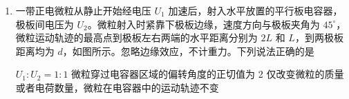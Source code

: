 \documentclass[\gkver]{gaokaozhenti}
\begin{document}
\begin{enumerate}
{$mg = f$，$f = \mu F_{N}$，$F_{N} = k\left(l - \frac{l}{2}\right)$

联立解得 $k = \frac{4mg}{l}$

A 正确；

C．在 PM 之间任取一点 A，令 AO 与 MN 之间的夹角为 $\theta$，则此时弹簧的弹力为

$F = k\left(l - \frac{l}{2\sin\theta}\right)$

小球受到的摩擦力为 $f_{1} = \mu F_{N1} = \mu F \sin \theta$

化简得 $f_{1} = \mu \left( kl \sin \theta - \frac{kl}{2} \right)$

$\theta$ 在 MP 之间增大在 PN 之间变小，即摩擦力先变大后变小，C 错误；

D．根据对称性可知在任意关于 P 点对称的点摩擦力大小相等，因此由对称性可知 M 到 P 和 P 到 N 摩擦力做功大小相等；D 正确；

B．小球运动到 P 点下方 $\frac{1}{2}l$ 时 $\theta = 45^\circ$，此时摩擦力大小为

$f_{1} = \mu \left( kl \frac{\sqrt{2}}{2} - \frac{kl}{2} \right)$

由牛顿第二定律 $mg+F\cos45^\circ-f_1=ma$，其中 $F=k(l-l/\sqrt{2})=(4-2\sqrt{2})mg$。

联立解得 $a=\sqrt{2}g$。

B 错误。

故选 AD。
}

\item
一带正电微粒从静止开始经电压 $U_{1}$ 加速后，射入水平放置的平行板电容器，极板间电压为 $U_{2}$。微粒射入时紧靠下极板边缘，速度方向与极板夹角为 $45^\circ$，微粒运动轨迹的最高点到极板左右两端的水平距离分别为 $2L$ 和 $L$，到两极板距离均为 $d$，如图所示。忽略边缘效应，不计重力。下列说法正确的是 


{$U_{1}:U_{2}=1:1$}
{微粒穿过电容器区域的偏转角度的正切值为 2}
{仅改变微粒的质量或者电荷数量，微粒在电容器中的运动轨迹不变}

\end{enumerate}
\end{document}
